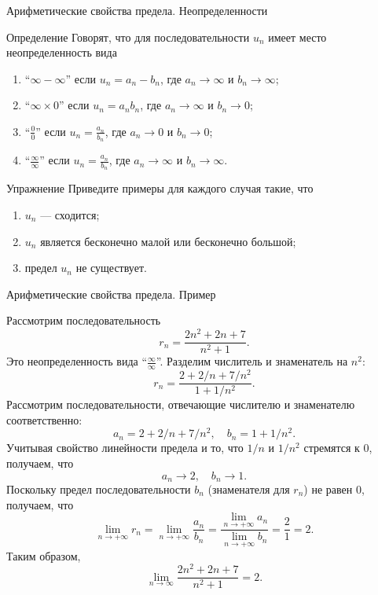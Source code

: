 \documentclass[8pt]{beamer}
\begin{document}
\begin{frame}{Арифметические свойства предела. Неопределенности}
\begin{block}{Определение}
Говорят, что для последовательности $u_n$ имеет место неопределенность вида
\begin{enumerate}
\item ``$\infty - \infty$'' если $u_n= a_n - b_n$, где $a_n\to \infty$ и $b_n \to \infty$;
\item ``$\infty \times 0$'' если $u_n= a_n b_n$, где $a_n\to \infty$ и $b_n \to 0$;
\item ``$\displaystyle \frac{0}{0}$'' если $\displaystyle u_n= \frac{a_n}{b_n}$, где $a_n\to 0$ и $b_n \to 0$;
\item ``$\displaystyle \frac{\infty}{\infty}$'' если $\displaystyle u_n= \frac{a_n}{b_n}$, где $a_n\to \infty$ и $b_n \to \infty$.
\end{enumerate}
\end{block}
\begin{block}{Упражнение}
Приведите примеры для каждого случая такие, что 
\begin{enumerate}
\item $u_n$ --- сходится;
\item $u_n$ является бесконечно малой или бесконечно большой;
\item предел $u_n$ не существует.
\end{enumerate}
\end{block}
\end{frame}

\begin{frame}{Арифметические свойства предела. Пример}

Рассмотрим последовательность
$$r_n=\frac{2n^2+2n+7}{n^2+1}.$$
Это неопределенность вида ``$\frac{\infty}{\infty}$''. Разделим числитель и знаменатель на $n^2$:
$$r_n=\frac{2+2/n+7/n^2}{1+1/n^2}.$$
Рассмотрим последовательности, отвечающие числителю и знаменателю соответственно:
$$a_n=2+2/n+7/n^2,\quad b_n=1+1/n^2.$$
Учитывая свойство линейности предела и то, что $1/n$ и $1/n^2$ стремятся к $0$, получаем, что
$$a_n\to 2,\quad b_n\to 1.$$
Поскольку предел последовательности $b_n$ (знаменателя для $r_n$) не равен $0$, получаем, что
$$\lim_{n\to+\infty} r_n = \lim_{n\to+\infty} \frac{a_n}{b_n} = \frac{\lim\limits_{n\to+\infty} a_n}{\lim\limits_{n\to+\infty} b_n}=\frac{2}{1}=2.$$
Таким образом,
$$\lim_{n\to\infty} \frac{2n^2+2n+7}{n^2+1} = 2.$$
\end{frame}
\end{document}
